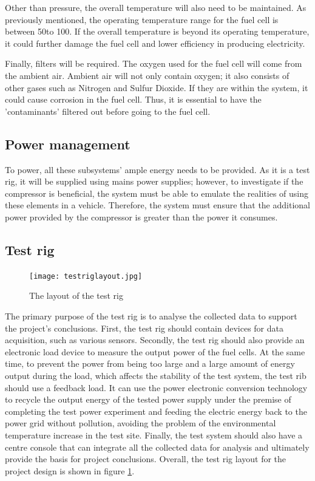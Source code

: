 \documentclass[a4paper,11pt]{article}
\begin{document}
Other than pressure, the overall temperature will also need to be maintained. As previously mentioned, the operating temperature range for the fuel cell is between 50\degree to 100\degree. If the overall temperature is beyond its operating temperature, it could further damage the fuel cell and lower efficiency in producing electricity\cite{lumley2009engines}.

Finally, filters will be required. The oxygen used for the fuel cell will come from the ambient air. Ambient air will not only contain oxygen; it also consists of other gases such as Nitrogen and Sulfur Dioxide\cite{ozyalcin2021investigation}. If they are within the system, it could cause corrosion in the fuel cell. Thus, it is essential to have the 'contaminants' filtered out before going to the fuel cell.

\subsection{Power management}
To power, all these subsystems' ample energy needs to be provided.  As it is a test rig, it will be supplied using mains power supplies; however, to investigate if the compressor is beneficial, the system must be able to emulate the realities of using these elements in a vehicle. Therefore, the system must ensure that the additional power provided by the compressor is greater than the power it consumes.

\subsection{Test rig}

\begin{figure}[h]
    \texttt{[image: testriglayout.jpg]}
    \caption{The layout of the test rig}
    \centering
    \label{fig:testriglayout}  
\end{figure}

The primary purpose of the test rig is to analyse the collected data to support the project's conclusions. First, the test rig should contain devices for data acquisition, such as various sensors. Secondly, the test rig should also provide an electronic load device to measure the output power of the fuel cells. At the same time, to prevent the power from being too large and a large amount of energy output during the load, which affects the stability of the test system, the test rib should use a feedback load. It can use the power electronic conversion technology to recycle the output energy of the tested power supply under the premise of completing the test power experiment and feeding the electric energy back to the power grid without pollution, avoiding the problem of the environmental temperature increase in the test site. Finally, the test system should also have a centre console that can integrate all the collected data for analysis and ultimately provide the basis for project conclusions. Overall, the test rig layout for the project design is shown in figure \ref{fig:testriglayout}.
\end{document}
